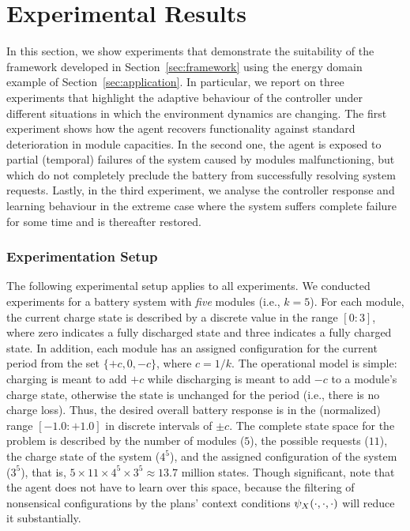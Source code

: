 
\section{Experimental Results}\label{sec:results}

In this section, we show experiments that demonstrate the suitability of the framework developed in Section~\ref{sec:framework} using the energy domain example of Section~\ref{sec:application}. In particular, we report on three experiments that highlight the adaptive behaviour of the controller under different situations in which the environment dynamics are changing. 
The first experiment shows how the agent recovers functionality against standard deterioration in module capacities. In the second one, the agent is exposed to partial (temporal) failures of the system caused by modules malfunctioning, but which do not completely preclude the battery from successfully resolving system requests. Lastly, in the third experiment, we analyse the controller response and learning behaviour in the extreme case where the system suffers complete failure for some time and is thereafter restored.



\subsubsection{Experimentation Setup}

The following experimental setup applies to all experiments. 
We conducted experiments for a battery system with \emph{five} modules (i.e., $k=5$). For each module, the current charge state is described by a discrete value in the range $[0:3]$, where zero indicates a fully discharged state and three indicates a fully charged state. In addition, each module has an assigned configuration for the current period from the set $\{+c, 0, -c\}$, where $c=1/k$. The operational model is simple: charging is meant to add $+c$ while discharging is meant to add $-c$ to a module's charge state, otherwise the state is unchanged for the period (i.e., there is no charge loss).
Thus, the desired overall battery response is in the (normalized) range $[-1.0:+1.0]$ in discrete intervals of $\pm c$. 
The complete state space for the problem is described by the number of modules ($5$), the possible requests ($11$), the charge state of the system ($4^5$), and the assigned configuration of the system ($3^5$), that is, $5 \times 11 \times 4^5 \times 3^5 \approx 13.7$ million states. Though significant, note that the agent does not have to learn over this space, because the filtering of nonsensical configurations by the plans' context conditions $\psi_X(\cdot,\cdot,\cdot)$ will reduce it substantially.




